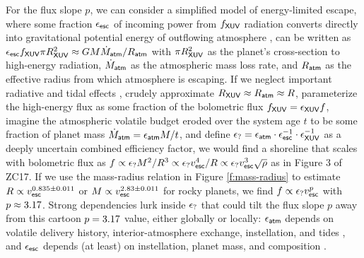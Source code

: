\documentclass[modern,linenumbers,trackchanges]{aastex7}
\begin{document}
For the flux slope $p$, we can consider a simplified model of energy-limited escape, where some fraction $\epsilon_{\sf esc}$ of incoming power from $f_{\sf XUV}$ radiation converts directly into gravitational potential energy of outflowing atmosphere \citep{watsonDynamicsRapidlyEscaping1981}, can be written as $\epsilon_{\sf esc} f_{\sf XUV} \pi R_{\sf XUV}^2 \approx GM \dot{M}_{\sf atm}/R_{\sf atm}$ with $\pi R_{\sf XUV}^2$ as the planet's cross-section to high-energy radiation, $\dot{M}_{\sf atm}$ as the atmospheric mass loss rate, and $R_{\sf atm}$ as the effective radius from which atmosphere is escaping. If we neglect important radiative and tidal effects \citep[see][]{lammerAtmosphericLossExoplanets2003, erkaevRocheLobeEffects2007}, crudely approximate $R_{\sf XUV} \approx R_{\sf atm} \approx R$, parameterize the high-energy flux as some fraction of the bolometric flux $f_{\sf XUV} = \epsilon_{\sf XUV} f$,  imagine the atmospheric volatile budget eroded over the system age $t$ to be some fraction of planet mass $\dot{M}_{\sf atm} = \epsilon_{\sf atm} M/t$, and define $\epsilon_{\sf ?} = \epsilon_{\sf atm} \cdot \epsilon_{\sf esc}^{-1} \cdot \epsilon_{\sf XUV}^{-1}$ as a deeply uncertain combined efficiency factor, we would find a shoreline that scales with bolometric flux as $f \propto \epsilon_{\sf ?}  M^2/R^3  \propto \epsilon_{\sf ?}  v_{\sf esc}^4/R  \propto \epsilon_{\sf ?}  v_{\sf esc}^3\sqrt{\rho}$ as in Figure 3 of ZC17. If we use the mass-radius relation in Figure \ref{f:mass-radius} to estimate $R\propto v_{\sf esc}^{0.835 \pm 0.011}$ or $M \propto v_{\sf esc}^{2.83 \pm 0.011}$ for rocky planets, we find $f \propto  \epsilon_{\sf ?}  v_{\sf esc}^p$ with $p \approx 3.17$. Strong dependencies lurk inside $\epsilon_{\sf ?}$ that could tilt the flux slope $p$ away from this cartoon $p=3.17$ value, either globally or locally: $\epsilon_{\sf atm}$ depends on volatile delivery history, interior-atmosphere exchange, instellation, and tides \citep{elkins-tantonRangesAtmosphericMass2008, schaeferPredictionsAtmosphericComposition2016c, kiteAtmosphereinteriorExchangeHot2016, seligmanPotentialMeltingExtrasolar2024}, and $\epsilon_{\sf esc}$ depends (at least) on instellation, planet mass, and composition \citep{murray-clayAtmosphericEscapeHot2009, owenPlanetaryEvaporationUV2012, owenEvaporationValleyKepler2017, chatterjeeNovelPhysicsEscaping2024, jiCosmicShorelineRevisited2025, leeCarvingEdgesRocky2025}.
\end{document}
